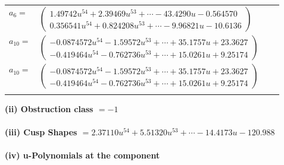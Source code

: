\documentclass[1p]{elsarticle_modified}
\theoremstyle{definition}
\begin{document}
\begin{tabular}{m{7pt} m{180pt} m{7pt} m{180pt} }
\flushright $a_{6}=$&$\begin{pmatrix}1.49742 u^{54}+2.39469 u^{53}+\cdots-43.4290 u-0.564570\\0.356541 u^{54}+0.824208 u^{53}+\cdots-9.96821 u-10.6136\end{pmatrix}$ \\
\flushright $a_{10}=$&$\begin{pmatrix}-0.0874572 u^{54}-1.59572 u^{53}+\cdots+35.1757 u+23.3627\\-0.419464 u^{54}-0.762736 u^{53}+\cdots+15.0261 u+9.25174\end{pmatrix}$\\ \flushright $a_{10}=$&$\begin{pmatrix}-0.0874572 u^{54}-1.59572 u^{53}+\cdots+35.1757 u+23.3627\\-0.419464 u^{54}-0.762736 u^{53}+\cdots+15.0261 u+9.25174\end{pmatrix}$\\&\end{tabular}
\flushleft \textbf{(ii) Obstruction class $= -1$}\\~\\
\flushleft \textbf{(iii) Cusp Shapes $= 2.37110 u^{54}+5.51320 u^{53}+\cdots-14.4173 u-120.988$}\\~\\
\newpage\renewcommand{\arraystretch}{1}
\flushleft \textbf{(iv) u-Polynomials at the component}\newline \\
\end{document}
